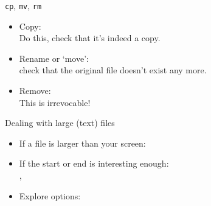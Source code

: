 \documentclass[11pt,headernav]{beamer}
\begin{document}


\begin{numberedframe}{\texttt{cp}, \texttt{mv}, \texttt{rm}}
  \label{sl-lnx:cpmv}
  \begin{itemize}
  \item Copy: \\
    Do this, check that it's indeed a copy.
  \item Rename or `move': \\
    check that the original file doesn't exist any more.
  \item Remove: \\
    This is irrevocable!
  \end{itemize}
\end{numberedframe}




\begin{numberedframe}{Dealing with large (text) files}
  \label{sl-lnx:headtail}
  \begin{itemize}
  \item If a file is larger than your screen:\\
  \item If the start or end is interesting enough:\\
    , 
  \item Explore options: 
  \end{itemize}
\end{numberedframe}
\end{document}
